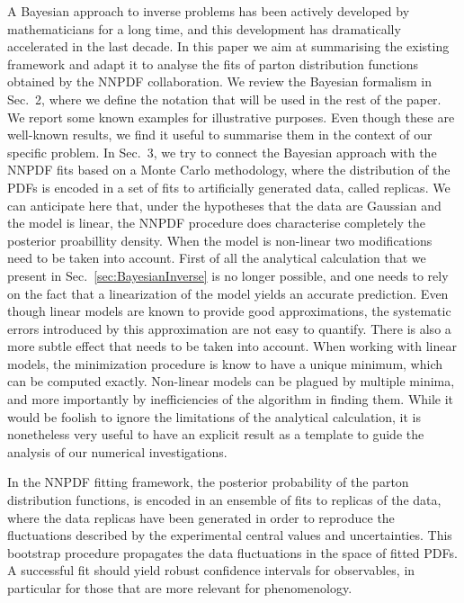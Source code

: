 A Bayesian approach to inverse problems has been actively developed by
mathematicians for a long time, and this development has dramatically
accelerated in the last decade. In this paper we aim at summarising the existing
framework and adapt it to analyse the fits of parton distribution functions
obtained by the NNPDF collaboration. We review the Bayesian formalism in
Sec.~2, where we define the notation that will be used in the rest of the
paper. We report some known examples for illustrative purposes. Even though
these are well-known results, we find it useful to summarise them in the context
of our specific problem. In Sec.~3, we try to connect the Bayesian approach
with the NNPDF fits based on a Monte Carlo methodology, where the distribution
of the PDFs is encoded in a set of fits to artificially generated data, called
replicas. We can anticipate here that, under the hypotheses that the data are
Gaussian and the model is linear, the NNPDF procedure does characterise
completely the posterior proabillity density. When the model is non-linear two
modifications need to be taken into account. First of all the analytical
calculation that we present in Sec.~\ref{sec:BayesianInverse} is no longer
possible, and one needs to rely on the fact that a linearization of the model
yields an accurate prediction. Even though linear models are known to provide
good approximations, the systematic errors introduced by this approximation are
not easy to quantify. There is also a more subtle effect that needs to be taken
into account. When working with linear models, the minimization procedure is
know to have a unique minimum, which can be computed exactly. Non-linear models
can be plagued by multiple minima, and more importantly by inefficiencies of the
algorithm in finding them. While it would be foolish to ignore the limitations
of the analytical calculation, it is nonetheless very useful to have an explicit
result as a template to guide the analysis of our numerical investigations. 

In the NNPDF fitting framework, the posterior probability of the parton
distribution functions, is encoded in an ensemble of fits to replicas of the
data, where the data replicas have been generated in order to reproduce the
fluctuations described by the experimental central values and uncertainties.
This bootstrap procedure propagates the data fluctuations in the space of fitted
PDFs. A successful fit should yield robust confidence intervals for observables,
in particular for those that are more relevant for phenomenology.

